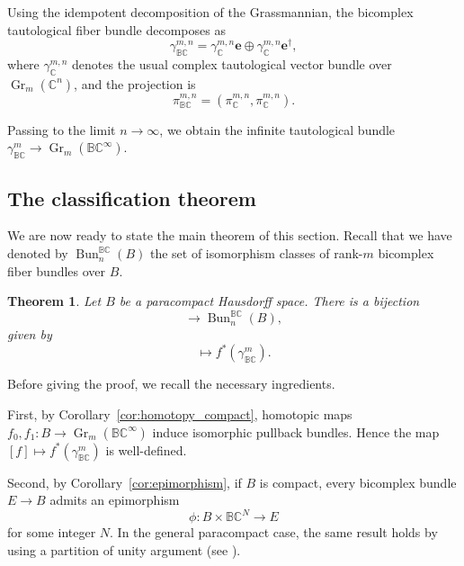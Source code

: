 \documentclass[11pt]{amsart}
\newcommand{\BC}{\mathbb{BC}}       %
\newcommand{\C}{\mathbb{C}}          %
\newcommand{\e}{\mathbf{e}}          %
\newcommand{\ed}{\mathbf{e}^\dagger} %
\newcommand{\Gr}{\operatorname{Gr}}
\newcommand{\Bun}[1][n]{\operatorname{Bun}_#1^\BC(B)}
\newtheorem{thm}[prop]{Theorem}
\theoremstyle{definition}
\begin{document}
Using the idempotent decomposition of the Grassmannian, the bicomplex tautological fiber bundle decomposes as
\begin{equation*}
    \gamma_{\BC}^{m,n} = \gamma^{m,n}_\C\e \oplus \gamma^{m,n}_\C\ed,
\end{equation*}
where $\gamma^{m,n}_\C$ denotes the usual complex tautological vector bundle over $\Gr_m(\C^n)$, and the projection is
\begin{equation*}
    \pi_{\BC}^{m,n} = (\pi_{\C}^{m,n}, \pi_{\C}^{m,n}).
\end{equation*}

Passing to the limit $n \to \infty$, we obtain the infinite tautological bundle $\gamma_{\BC}^m \to \Gr_m(\BC^\infty)$.

\subsection{The classification theorem}

We are now ready to state the main theorem of this section. Recall that we have denoted by $\Bun$ the set of isomorphism classes of rank-$m$ bicomplex fiber bundles over $B$.

\begin{thm}\label{thm:classification}
    Let $B$ be a paracompact Hausdorff space. There is a bijection
    \begin{equation*}
        [B, \Gr_m(\BC^\infty)] \to \Bun,
    \end{equation*}
    given by
    \begin{equation}
        [f] \mapsto f^*(\gamma_{\BC}^m).
    \end{equation}
\end{thm}

Before giving the proof, we recall the necessary ingredients.

First, by Corollary~\ref{cor:homotopy_compact}, homotopic maps $f_0, f_1: B \to \Gr_m(\BC^\infty)$ induce isomorphic pullback bundles. Hence the map $[f] \mapsto f^*(\gamma_{\BC}^m)$ is well-defined.

Second, by Corollary~\ref{cor:epimorphism}, if $B$ is compact, every bicomplex bundle $E \to B$ admits an epimorphism
\begin{equation*}
    \phi: B \times \BC^N \to E
\end{equation*}
for some integer $N$. In the general paracompact case, the same result holds by using a partition of unity argument (see \cite[Proposition~1.4.15]{Ati1967}).
\end{document}
